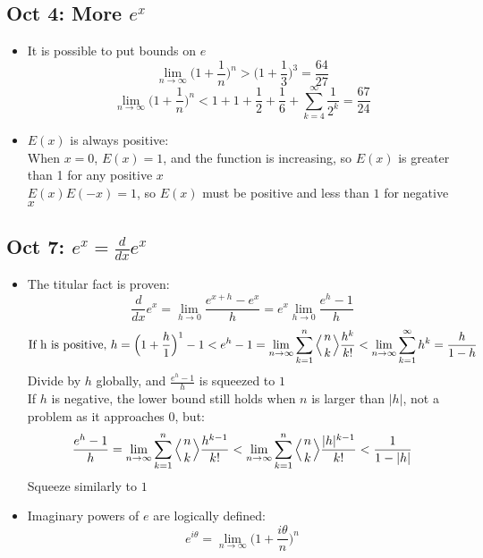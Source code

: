 \documentclass[10pt, oneside]{article}
\newcommand{\lti}[1]{\lim_{#1 \rightarrow \infty}}
\newcommand{\ltz}[1]{\lim_{#1 \rightarrow 0}}
\newcommand{\stack}[2]{\genfrac{}{}{0pt}{}{#1}{#2}}
\begin{document}
\subsection{Oct 4: More $e^x$}
\begin{itemize}
    \item It is possible to put bounds on $e$
        \[\lti{n} \Big( 1 + \frac{1}{n} \Big) ^n > \Big( 1 + \frac{1}{3} \Big) ^3 = \frac{64}{27}\]
        \[\lti{n} \Big( 1 + \frac{1}{n} \Big) ^n < 1 + 1 + \frac{1}{2} + \frac{1}{6} + \sum_{k = 4}^\infty \frac{1}{2^k} = \frac{67}{24}\]
    \item $E(x)$ is always positive:\\
        When $x = 0$, $E(x) = 1$, and the function is increasing, so $E(x)$ is greater than 1 for any positive $x$\\
        $E(x)E(-x) = 1$, so $E(x)$ must be positive and less than $1$ for negative $x$
\end{itemize}

\subsection{Oct 7: $e^x = \frac{d}{dx} e^x$}
\begin{itemize}
    \item The titular fact is proven:
        \[\frac{d}{dx} e^x = \ltz{h} \frac{e^{x+h} - e^x}{h} =  e^x \ltz{h} \frac{e^h - 1}{h}\]
        \[\text{If h is positive, } h  = \Big( 1 + \frac{h}{1} \Big) ^1 - 1 < e^h - 1 = \lti{n} \sum_{k=1}^n \Big\langle \stack{n}{k} \Big\rangle \frac{h^k}{k!} < \lti{n} \sum_{k=1}^\infty h^k = \frac{h}{1-h}\]
        Divide by $h$ globally, and $\frac{e^h - 1}{h}$ is squeezed to $1$\\
        If $h$ is negative, the lower bound still holds when $n$ is larger than $|h|$, not a problem as it approaches $0$, but:
        \[\frac{e^h - 1}{h} =  \lti{n} \sum_{k=1}^n \Big\langle \stack{n}{k} \Big\rangle \frac{h^{k-1}}{k!} < \lti{n} \sum_{k=1}^n \Big\langle \stack{n}{k} \Big\rangle \frac{|h|^{k-1}}{k!} < \frac{1}{1-|h|}\]
        Squeeze similarly to $1$
    \item Imaginary powers of $e$ are logically defined:
        \[e^{i \theta} = \lti{n} \Big( 1 + \frac{i \theta}{n} \Big) ^n\]
\end{itemize}
\end{document}
